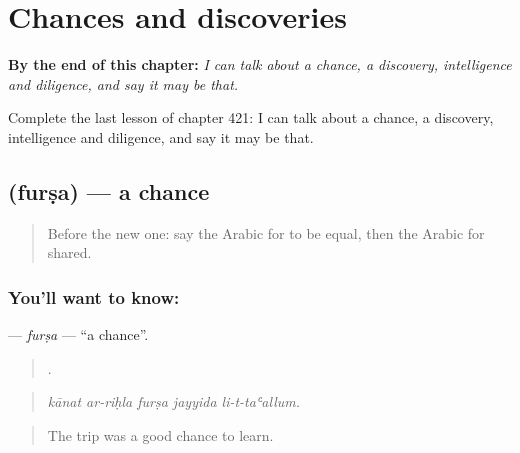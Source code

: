 
\chapter{Chances and discoveries}
\label{ch:ar-chances-and-discoveries}

\begin{chapteropening}
\textbf{By the end of this chapter:} \emph{I can talk about a chance, a discovery, intelligence and diligence, and say it may be that.}

Complete the last lesson of chapter 421: I can talk about a chance, a discovery, intelligence and diligence, and say it may be that.
\end{chapteropening}

\section[\texorpdfstring{\ar{فرصة} (furṣa)}{فرصة (furṣa)}]{ (furṣa) — a chance}

\label{lesson:AR-C421-fursa}



\begin{quote}
Before the new one: say the Arabic for to be equal, then the Arabic for shared.
\end{quote}

\subsection*{You'll want to know: }
\textbf{} — \emph{furṣa} — \textquotedblleft{}a chance\textquotedblright{}.

\begin{quote}
    .
\end{quote}

\begin{quote}
\emph{kānat ar-riḥla furṣa jayyida li-t-taʿallum.}
\end{quote}

\begin{quote}
The trip was a good chance to learn.
\end{quote}

